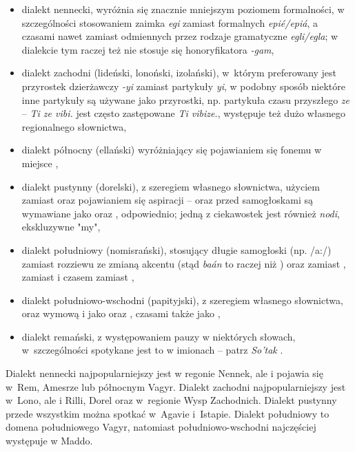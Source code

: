 \begin{spacing}{1.1}
\begin{itemize}
    \item dialekt nennecki, wyróżnia się znacznie mniejszym poziomem
    formalności, w szczególności stosowaniem zaimka \emph{egi} zamiast
    formalnych \emph{epié/epiá}, a czasami nawet zamiast odmiennych przez
    rodzaje gramatyczne \emph{egli/egla}; w dialekcie tym raczej też nie stosuje
    się honoryfikatora \emph{-gam},
    \item dialekt zachodni (lideński, lonoński, izolański), w~którym preferowany
    jest przyrostek dzierżawczy \emph{-yi} zamiast partykuły \emph{yi}, w
    podobny sposób niektóre inne partykuły są używane jako przyrostki, np.
    partykuła czasu przyszłego \emph{ze} -- \emph{Ti ze vibi.} jest często
    zastępowane \emph{Ti vibize.}, występuje też dużo własnego regionalnego
    słownictwa,
    \item dialekt północny (ellański) wyróżniający się pojawianiem się fonemu
     w miejsce ,
    \item dialekt pustynny (dorelski), z szeregiem własnego słownictwa, użyciem
     zamiast  oraz pojawianiem się aspiracji --  oraz 
    przed samogłoskami są wymawiane jako  oraz , odpowiednio;
    jedną z ciekawostek jest również \emph{nodi}, ekskluzywne "my",
    \item dialekt południowy (nomisrański), stosujący długie samogłoski (np.
    /a:/) zamiast rozziewu ze zmianą akcentu (stąd \emph{baán} to raczej
     niż ) oraz  zamiast ,  zamiast 
    i czasem  zamiast ,
    \item dialekt południowo-wschodni (papityjski), z szeregiem własnego
    słownictwa, oraz wymową  i  jako  oraz , czasami
    także  jako ,
	\item dialekt remański, z występowaniem pauzy \xt{|} w niektórych słowach,
	w~szczególności spotykane jest to w imionach -- patrz \emph{So'tak}
	.
\end{itemize}

Dialekt nennecki najpopularniejszy jest w regonie Nennek, ale i pojawia się
w~Rem, Amesrze lub północnym Vagyr. Dialekt zachodni najpopularniejszy jest
w~Lono, ale i Rilli, Dorel oraz w~regionie Wysp Zachodnich. Dialekt pustynny
przede wszystkim można spotkać w~Agavie i~Istapie. Dialekt południowy to domena
południowego Vagyr, natomiast południowo-wschodni najczęściej występuje w Maddo.


\end{spacing}

